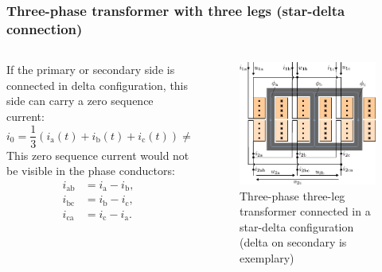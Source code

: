 \begin{frame}
	\frametitle{Three-phase transformer with three legs (star-delta connection)}
	\begin{columns}
		\begin{column}{0.4\textwidth}
 			If the primary or secondary side is connected in delta configuration, this side can carry a zero sequence current:
			\begin{equation*}
				i_0 = \frac{1}{3}\left(i_\mathrm{a}(t) + i_\mathrm{b}(t) + i_\mathrm{c}(t)\right) \neq 0 .
			\end{equation*}
			This zero sequence current would not be visible in the phase conductors:
			\begin{equation}
				\begin{split}
					i_\mathrm{ab} &= i_\mathrm{a} - i_\mathrm{b}, \\ i_\mathrm{bc} &= i_\mathrm{b} - i_\mathrm{c},\\ i_\mathrm{ca} &= i_\mathrm{c} - i_\mathrm{a}.
				\end{split}
				\label{eq:zero_sequence_currents_phase_transformer}
			\end{equation}
		\end{column}
        \hfill
		\begin{column}{0.6\textwidth}
			\begin{figure}
				\includegraphics[height=0.7\textheight]{fig/lec04/Three_phase_transformer_3_legs_star_delta.pdf}
				\caption{Three-phase three-leg transformer connected in a star-delta configuration (delta on secondary is exemplary)}
				\label{fig:Three_phase_transformer_3_legs_star_delta}
			\end{figure}
		\end{column}
	\end{columns}
\end{frame}

